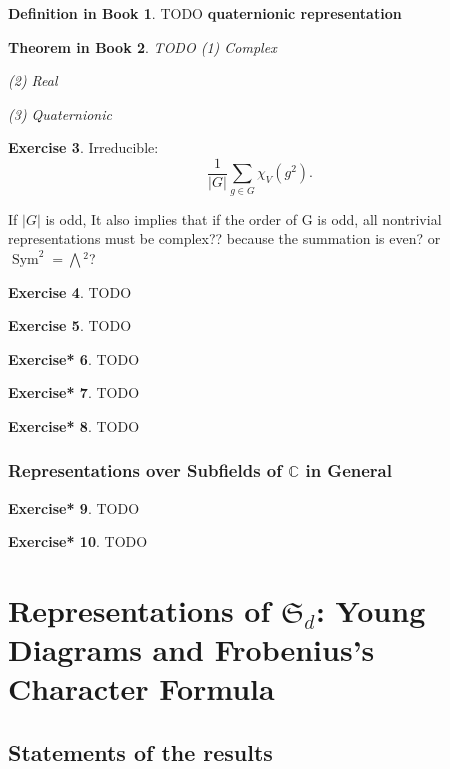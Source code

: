 \documentclass[12pt, letterpaper]{article}
\newcommand{\co}{\mathbb{C}}
\newcommand{\Sym}{\operatorname{Sym}}
\newcommand{\ext}[1]{\bigwedge\!^{#1}}
\newcommand{\red}[1]{{\color{red} #1}}
\newcommand{\card}[1]{\left\lvert #1 \right\rvert}
\theoremstyle{definition}
\theoremstyle{remark}
\theoremstyle{definition}
\newtheorem{exe}{Exercise}[section]
\newtheorem{exe*}[exe]{Exercise*}
\newtheorem{ddef}[exe]{Definition in Book}
\theoremstyle{plain}
\newtheorem{tthm}[exe]{Theorem in Book}
\numberwithin{equation}{section}
\begin{document}
	\begin{ddef}
		\red{TODO}
		\textbf{quaternionic representation}
	\end{ddef}

	\begin{tthm}
		\red{TODO}
		(1) Complex
		
		(2) Real
		
		(3) Quaternionic
	\end{tthm}

	\begin{exe}
		Irreducible: \[\frac{1}{\card{G}}\sum_{g\in G}\chi_{V}(g^2).\]
		
		If $\card{G}$ is odd, \red{It also 
			implies that if the order of G is odd, all nontrivial representations must be 
			complex?? because the summation is even? or $\Sym^2=\ext{2}$?}
	\end{exe}

	\begin{exe}
		\red{TODO}
	\end{exe}
	\begin{exe}
		\red{TODO}
	\end{exe}
	\begin{exe*}
		\red{TODO}
	\end{exe*}
	\begin{exe*}
		\red{TODO}
	\end{exe*}
	\begin{exe*}
		\red{TODO}
	\end{exe*}
	\subsubsection{Representations over Subfields of $\co$ in General}
	
	\begin{exe*}
		\red{TODO}
	\end{exe*}
	\begin{exe*}
		\red{TODO}
	\end{exe*}
	\section{Representations of $\mathfrak{S}_d$: Young Diagrams and Frobenius's Character Formula}

	\subsection{Statements of the results}
\end{document}
